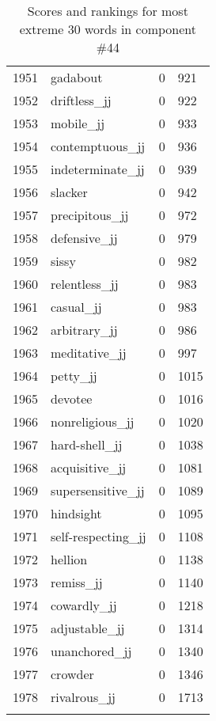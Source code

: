 \begin{longtable}[!htbp]{| rlr@{.}l |}
    1951 & gadabout & 0 & 921 \\
    1952 & driftless\_jj & 0 & 922 \\
    1953 & mobile\_jj & 0 & 933 \\
    1954 & contemptuous\_jj & 0 & 936 \\
    1955 & indeterminate\_jj & 0 & 939 \\
    1956 & slacker & 0 & 942 \\
    1957 & precipitous\_jj & 0 & 972 \\
    1958 & defensive\_jj & 0 & 979 \\
    1959 & sissy & 0 & 982 \\
    1960 & relentless\_jj & 0 & 983 \\
    1961 & casual\_jj & 0 & 983 \\
    1962 & arbitrary\_jj & 0 & 986 \\
    1963 & meditative\_jj & 0 & 997 \\
    1964 & petty\_jj & 0 & 1015 \\
    1965 & devotee & 0 & 1016 \\
    1966 & nonreligious\_jj & 0 & 1020 \\
    1967 & hard-shell\_jj & 0 & 1038 \\
    1968 & acquisitive\_jj & 0 & 1081 \\
    1969 & supersensitive\_jj & 0 & 1089 \\
    1970 & hindsight & 0 & 1095 \\
    1971 & self-respecting\_jj & 0 & 1108 \\
    1972 & hellion & 0 & 1138 \\
    1973 & remiss\_jj & 0 & 1140 \\
    1974 & cowardly\_jj & 0 & 1218 \\
    1975 & adjustable\_jj & 0 & 1314 \\
    1976 & unanchored\_jj & 0 & 1340 \\
    1977 & crowder & 0 & 1346 \\
    1978 & rivalrous\_jj & 0 & 1713 \\
    \hline
    \caption{Scores and rankings for most extreme 30 words in component \#44} \\
\end{longtable}
